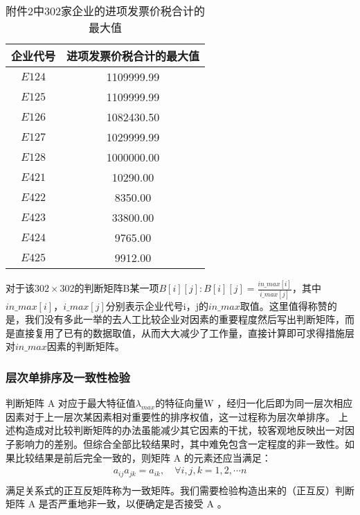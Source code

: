 \documentclass{cumcmthesis}
\begin{document}
\begin{table}[H]
    
    \label{tablesymbol}
    \centering
    \begin{tabular}{|c|c|}   
    \hline
    企业代号 & 进项发票价税合计的最大值 \\
    \hline 
    $E124$  &  1109999.99\\
    $E125$  &  1109999.99\\
    $E126$  &  1082430.50\\
    $E127$  &  1029999.99\\
    $E128$  &  1000000.00\\
         
    $E421$  &    10290.00\\
    $E422$  &     8350.00\\
    $E423$  &    33800.00\\
    $E424$  &     9765.00\\
    $E425$  &     9912.00\\
    \hline
    \end{tabular}
    \caption{附件2中302家企业的进项发票价税合计的最大值}
    \label{table2}
\end{table}

对于该$302 \times 302$的判断矩阵B某一项$B[i][j]: B[i][j] = \frac{in\_max[i]}{i\_max[j]}$，其中$in\_max[i]$，$i\_max[j]$分别表示企业代号i，j的$in\_max$取值。这里值得称赞的是，我们没有多此一举的去人工比较企业对因素的重要程度然后写出判断矩阵，而是直接复用了已有的数据取值，从而大大减少了工作量，直接计算即可求得措施层对$in\_max$因素的判断矩阵。

\subsubsection{层次单排序及一致性检验}
判断矩阵 A 对应于最大特征值$λ_{max}$的特征向量W ，经归一化后即为同一层次相应因素对于上一层次某因素相对重要性的排序权值，这一过程称为层次单排序。
上述构造成对比较判断矩阵的办法虽能减少其它因素的干扰，较客观地反映出一对因子影响力的差别。但综合全部比较结果时，其中难免包含一定程度的非一致性。如果比较结果是前后完全一致的，则矩阵 A 的元素还应当满足：
\begin{equation}
    \begin{split}
        a_{ij}a_{jk} = a_{ik},  \quad  \forall i,j,k = 1,2,\cdots n \\
    \end{split}
\end{equation}
满足关系式的正互反矩阵称为一致矩阵。我们需要检验构造出来的（正互反）判断矩阵 A 是否严重地非一致，以便确定是否接受 A 。 
\end{document}
